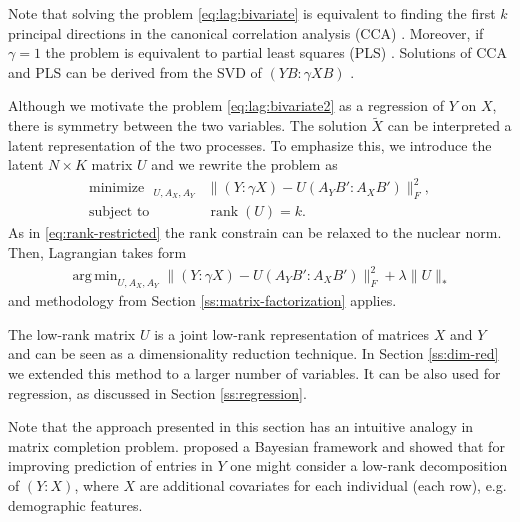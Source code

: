 \documentclass[preprint]{imsart}
\numberwithin{equation}{section}
\theoremstyle{plain}
\DeclareMathOperator*{\argmin}{arg\,min}
\DeclareMathOperator*{\rank}{rank}
\DeclareMathOperator*{\minimize}{minimize\ \ }
\DeclareMathOperator*{\subjectto}{subject\ to\ \ }
\begin{document}
Note that solving the problem \eqref{eq:lag:bivariate} is equivalent to finding the first $k$ principal directions in the canonical correlation analysis (CCA) \citep{hotelling1936relations}. Moreover, if $\gamma=1$ the problem is equivalent to partial least squares (PLS) \citep{wold1975soft}. Solutions of CCA and PLS can be derived from the SVD of $(YB:\gamma XB)$ \citep{borga1997unified}.

Although we motivate the problem \eqref{eq:lag:bivariate2} as a regression of $Y$ on $X$, there is symmetry between the two variables. The solution $\tilde{X}$ can be interpreted a latent representation of the two processes. To emphasize this, we introduce the latent $N \times K$ matrix $U$ and we rewrite the problem as
\begin{align}\label{eq:lag:bivariate2}
  \minimize_{U,A_X,A_Y} & \| (Y:\gamma X) - U(A_YB':A_XB') \|_F^2,\nonumber\\
  \subjectto & \rank(U) = k.
\end{align}
As in \eqref{eq:rank-restricted} the rank constrain can be relaxed to the nuclear norm. Then, Lagrangian takes form
\begin{align}
  \argmin_{U,A_X,A_Y} \| (Y:\gamma X) - U(A_YB':A_XB') \|_F^2 + \lambda \| U \|_*  \label{eq:final-bivariate}
\end{align}
and methodology from Section \ref{ss:matrix-factorization} applies.

The low-rank matrix $U$ is a joint low-rank representation of matrices $X$ and $Y$ and can be seen as a dimensionality reduction technique. In Section \ref{ss:dim-red} we extended this method to a larger number of variables. It can be also used for regression, as discussed in Section \ref{ss:regression}.

Note that the approach presented in this section has an intuitive analogy in matrix completion problem. \citet{condli1999bayesian} proposed a Bayesian framework and showed that for improving prediction of entries in $Y$ one might consider a low-rank decomposition of $(Y:X)$, where $X$ are additional covariates for each individual (each row), e.g. demographic features.

\end{document}
